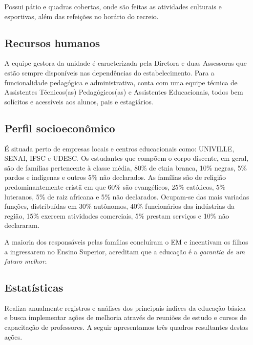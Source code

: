 Possui pátio e quadras cobertas, onde são feitas as atividades culturais e esportivas, além das refeições no horário do recreio.

\subsection{Recursos humanos}
A equipe gestora da unidade é caracterizada pela Diretora e duas Assessoras que estão sempre disponíveis nas dependências do estabelecimento. Para a funcionalidade pedagógica e administrativa, conta com uma equipe técnica de Assistentes Técnicos(as) Pedagógicos(as) e Assistentes Educacionais, todos bem solícitos e acessíveis aos alunos, pais e estagiários.

\subsection{Perfil socioeconômico}
É situada perto de empresas locais e centros educacionais como: UNIVILLE, SENAI, IFSC e UDESC. Os estudantes que compõem o corpo discente, em geral, são de famílias pertencente à classe média, 80\% de etnia branca, 10\% negras, 5\% pardos e indígenas e outros 5\% não declarados. As famílias são de religião predominantemente cristã em que 60\% são evangélicos, 25\% católicos, 5\% luteranos, 5\% de raiz africana e 5\% não declarados. Ocupam-se das mais variadas funções, distribuídas em 30\% autônomos, 40\% funcionários das indústrias da região, 15\% exercem atividades comerciais, 5\% prestam serviços e 10\% não declararam.

A maioria dos responsáveis pelas famílias concluíram o EM e incentivam os filhos a ingressarem no Ensino Superior, acreditam que a educação é a \emph{garantia de um futuro melhor}.

\subsection{Estatísticas}
Realiza anualmente registros e análises dos principais índices da educação básica e busca implementar ações  de melhoria através de reuniões de estudo e cursos de capacitação de professores. A seguir apresentamos três quadros resultantes destas ações.


